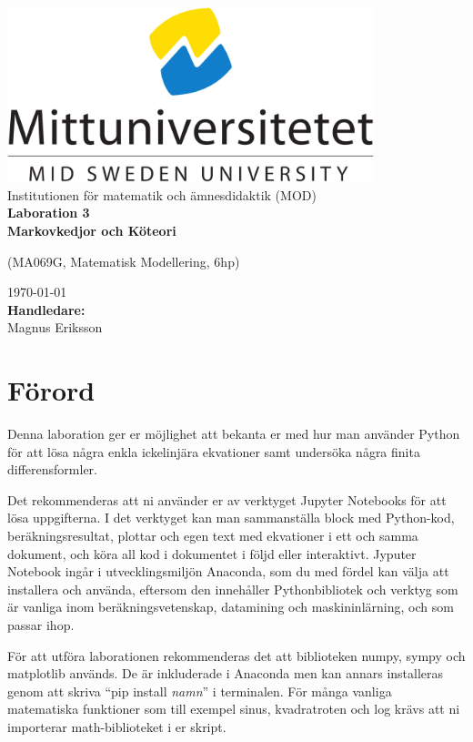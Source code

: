 \documentclass[a4paper]{article}
\newcommand{\gettitle}{Laboration 3 \\ Markovkedjor och Köteori} %
\newcommand{\getcourse}{(MA069G, Matematisk Modellering, 6hp)} %
\newcommand{\getsupervisor}{Magnus Eriksson}
\begin{document}
\begin{titlepage}
  \begin{center}
    \vspace*{1cm}
    \includegraphics[width=0.8\textwidth]{msu.png}\\[0.5cm]
    \Large
    Institutionen för matematik och ämnesdidaktik (MOD)\\[1cm]
    \Huge
    \textbf{\gettitle}

    \large
    \getcourse{}

    \vspace{1cm}

    \vfill
    \vspace{0.8cm}
    \small
    \today \\
    \Large
    \textbf{Handledare:}\\
    \getsupervisor{}
  \end{center}
\end{titlepage}

\tableofcontents
\newpage

\section{Förord}
Denna laboration ger er möjlighet att bekanta er med hur man använder
Python för att lösa några enkla ickelinjära ekvationer samt undersöka
några finita differensformler.

Det rekommenderas att ni använder er av verktyget Jupyter Notebooks för att lösa
uppgifterna. I det verktyget kan man sammanställa block med Python-kod, beräkningsresultat,
plottar och egen text med ekvationer i ett och samma dokument, och köra all kod i dokumentet
i följd eller interaktivt. Jyputer Notebook ingår i utvecklingsmiljön Anaconda, som du med
fördel kan välja att installera och använda, eftersom den innehåller Pythonbibliotek och
verktyg som är vanliga inom beräkningsvetenskap, datamining och maskininlärning, och som passar ihop.

För att utföra laborationen rekommenderas det att biblioteken numpy,
sympy och matplotlib används. De är inkluderade i Anaconda men kan annars installeras genom att
skriva ``pip install \textit{namn}'' i terminalen. För många vanliga matematiska funktioner som till
exempel sinus, kvadratroten och log krävs att ni importerar math-biblioteket i er skript.
\end{document}
